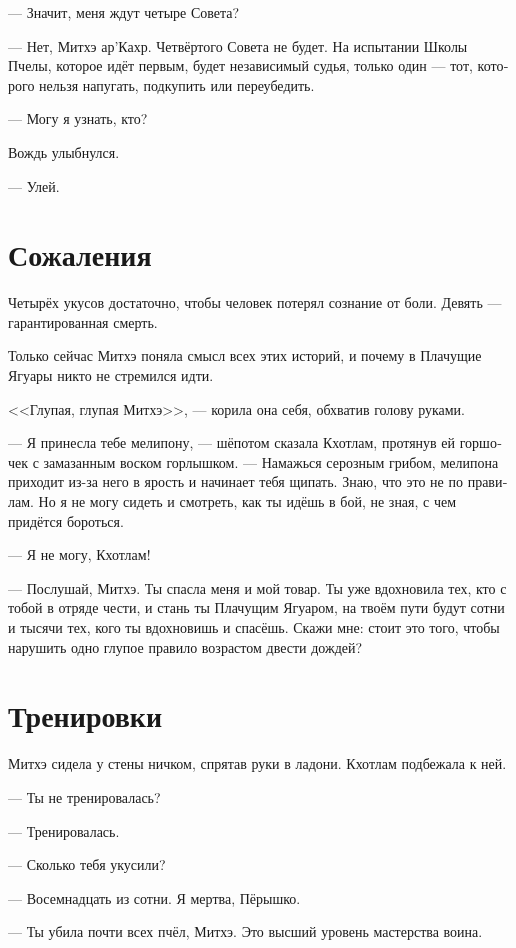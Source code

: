 \documentclass[a4paper,12pt,fleqn]{book}\usepackage{cooltooltips}\usepackage{polyglossia}\setdefaultlanguage{russian}\setotherlanguage{english}\defaultfontfeatures{Ligatures=TeX,Mapping=tex-text} \usepackage{xcolor}\definecolor{lightgray}{HTML}{bbbbbb}\color{lightgray}\newcommand{\ml}[3]{\textenglish{\textcolor{black}{#3}}}
\newcommand{\textspace}{\vspace{1em}{\centering\Large\bfseries<...>\par}\vspace{1em}}
\begin{document}
--- Значит, меня ждут четыре Совета?

--- Нет, Митхэ ар'Кахр.
Четвёртого Совета не будет.
На испытании Школы Пчелы, которое идёт первым, будет независимый судья, только один --- тот, которого нельзя напугать, подкупить или переубедить.

--- Могу я узнать, кто?

Вождь улыбнулся.

--- Улей.

\section{Сожаления}

Четырёх укусов достаточно, чтобы человек потерял сознание от боли.
Девять --- гарантированная смерть.

Только сейчас Митхэ поняла смысл всех этих историй, и почему в Плачущие Ягуары никто не стремился идти.

<<Глупая, глупая Митхэ>>, --- корила она себя, обхватив голову руками.

\textspace

--- Я принесла тебе мелипону, --- шёпотом сказала Кхотлам, протянув ей горшочек с замазанным воском горлышком.
--- Намажься серозным грибом, мелипона приходит из-за него в ярость и начинает тебя щипать.
Знаю, что это не по правилам.
Но я не могу сидеть и смотреть, как ты идёшь в бой, не зная, с чем придётся бороться.

--- Я не могу, Кхотлам!

--- Послушай, Митхэ.
Ты спасла меня и мой товар.
Ты уже вдохновила тех, кто с тобой в отряде чести, и стань ты Плачущим Ягуаром, на твоём пути будут сотни и тысячи тех, кого ты вдохновишь и спасёшь.
Скажи мне: стоит это того, чтобы нарушить одно глупое правило возрастом двести дождей?

\section{Тренировки}

Митхэ сидела у стены ничком, спрятав руки в ладони.
Кхотлам подбежала к ней.

--- Ты не тренировалась?

--- Тренировалась.

--- Сколько тебя укусили?

--- Восемнадцать из сотни.
Я мертва, Пёрышко.

--- Ты убила почти всех пчёл, Митхэ.
Это высший уровень мастерства воина.
\end{document}
